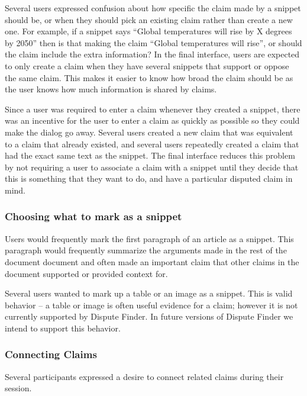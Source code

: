 \documentclass{www2010-submission}
\newcommand{\todo}[1]{}
\begin{document}
Several users expressed confusion about how specific the claim made by a snippet should be, or when they should pick an existing claim rather than create a new one. For example, if a snippet says ``Global temperatures will rise by X degrees by 2050'' then is that making the claim ``Global temperatures will rise'', or should the claim include the extra information? In the final interface, users are expected to only create a claim when they have several snippets that support or oppose the same claim. This makes it easier to know how broad the claim should be as the user knows how much information is shared by claims.

Since a user was required to enter a claim whenever they created a snippet, there was an incentive for the user to enter a claim as quickly as possible so they could make the dialog go away. 
Several users created a new claim that was equivalent to a claim that already existed, and several users repeatedly created a claim that had the exact same text as the snippet. The final interface reduces this problem by not requiring a user to associate a claim with a snippet until they decide that this is something that they want to do, and have a particular disputed claim in mind.

\todo{Need to do some kind of evaluation to show that the new interface solves these problems}


\subsubsection{Choosing what to mark as a snippet}

Users would frequently mark the first paragraph of an article as a snippet. This paragraph would frequently summarize the arguments made in the rest of the document document and often made an important claim that other claims in the document supported or provided context for. 

Several users wanted to mark up a table or an image as a snippet. This is valid behavior -- a table or image is often useful evidence for a claim; however it is not currently supported by Dispute Finder. In future versions of Dispute Finder we intend to support this behavior.


\subsubsection{Connecting Claims}

Several participants expressed a desire to connect related claims during their session. 
\end{document}
